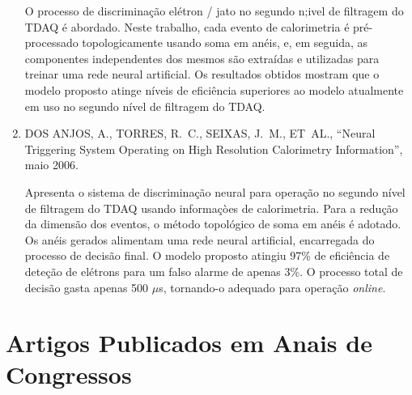\begin{enumerate}
O processo de discriminação elétron / jato no segundo n;ivel de filtragem do TDAQ é abordado. Neste trabalho, cada evento de calorimetria é pré-processado topologicamente usando soma em anéis, e, em seguida, as componentes independentes dos mesmos são extraídas e utilizadas para treinar uma rede neural artificial. Os resultados obtidos mostram que o modelo proposto atinge níveis de eficiência superiores ao modelo atualmente em uso no segundo nível de filtragem do TDAQ.


\item \MakeUppercase{ {{dos} Anjos}, A., Torres, R.~C., Seixas, J.~M.,
  \MakeLowercase{et~al.}}, \enquote{Neural Triggering System Operating on High
  Resolution Calorimetry Information}, maio 2006.

Apresenta o sistema de discriminação neural para operação no segundo nível de filtragem do TDAQ usando informaçòes de calorimetria. Para a redução da dimensão dos eventos, o método topológico de soma em anéis é adotado. Os anéis gerados alimentam uma rede neural artificial, encarregada do processo de decisão final. O modelo proposto atingiu 97\% de eficiência de deteção de elétrons para um falso alarme de apenas 3\%. O processo total de decisão gasta apenas 500 $\mu$s, tornando-o adequado para operação \emph{online}.

\end{enumerate} 


\section{Artigos Publicados em Anais de Congressos}

